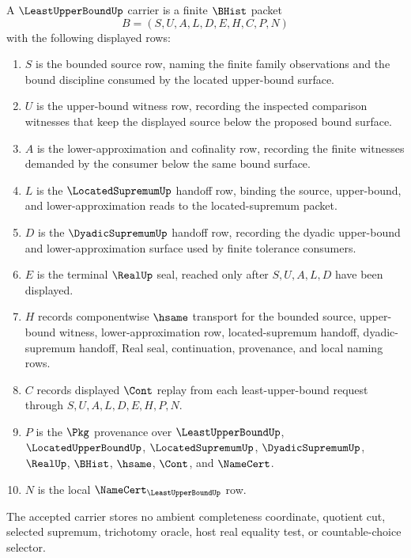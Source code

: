 \begin{definition}
\label{def:least-upper-bound-carrier}
A $\LeastUpperBoundUp$ carrier is a finite $\BHist$ packet
$$
B=(S,U,A,L,D,E,H,C,P,N)
$$
with the following displayed rows:
\begin{enumerate}
\item $S$ is the bounded source row, naming the finite family observations and the bound discipline consumed by the located upper-bound surface.
\item $U$ is the upper-bound witness row, recording the inspected comparison witnesses that keep the displayed source below the proposed bound surface.
\item $A$ is the lower-approximation and cofinality row, recording the finite witnesses demanded by the consumer below the same bound surface.
\item $L$ is the $\LocatedSupremumUp$ handoff row, binding the source, upper-bound, and lower-approximation reads to the located-supremum packet.
\item $D$ is the $\DyadicSupremumUp$ handoff row, recording the dyadic upper-bound and lower-approximation surface used by finite tolerance consumers.
\item $E$ is the terminal $\RealUp$ seal, reached only after $S,U,A,L,D$ have been displayed.
\item $H$ records componentwise $\hsame$ transport for the bounded source, upper-bound witness, lower-approximation row, located-supremum handoff, dyadic-supremum handoff, Real seal, continuation, provenance, and local naming rows.
\item $C$ records displayed $\Cont$ replay from each least-upper-bound request through $S,U,A,L,D,E,H,P,N$.
\item $P$ is the $\Pkg$ provenance over $\LeastUpperBoundUp$, $\LocatedUpperBoundUp$, $\LocatedSupremumUp$, $\DyadicSupremumUp$, $\RealUp$, $\BHist$, $\hsame$, $\Cont$, and $\NameCert$.
\item $N$ is the local $\NameCert_{\LeastUpperBoundUp}$ row.
\end{enumerate}
The accepted carrier stores no ambient completeness coordinate, quotient cut, selected supremum, trichotomy oracle, host real equality test, or countable-choice selector.
\end{definition}

